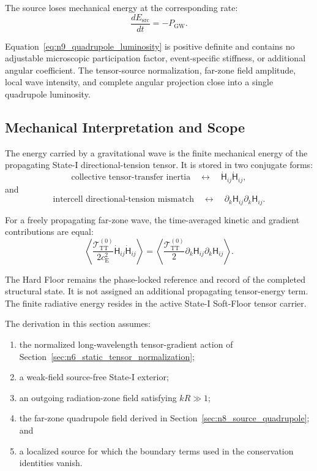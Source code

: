The source loses mechanical energy at the corresponding rate:
\begin{equation}
    \frac{dE_{\mathrm{src}}}{dt} = - P_{\mathrm{GW}}.
    \label{eq:n9_source_energy_loss}
\end{equation}

Equation~\eqref{eq:n9_quadrupole_luminosity} is positive definite and contains no adjustable microscopic participation factor, event-specific stiffness, or additional angular coefficient. The tensor-source normalization, far-zone field amplitude, local wave intensity, and complete angular projection close into a single quadrupole luminosity.

\subsection{Mechanical Interpretation and Scope}
\label{subsec:n9_mechanical_interpretation}

The energy carried by a gravitational wave is the finite mechanical energy of the propagating State-I directional-tension tensor. It is stored in two conjugate forms:
\begin{equation}
    \text{collective tensor-transfer inertia} \quad\longleftrightarrow\quad \dot{\mathsf{H}}_{ij} \dot{\mathsf{H}}_{ij},
\end{equation}
and
\begin{equation}
    \text{intercell directional-tension mismatch} \quad\longleftrightarrow\quad \partial_{k}\mathsf{H}_{ij} \partial_{k}\mathsf{H}_{ij}.
\end{equation}

For a freely propagating far-zone wave, the time-averaged kinetic and gradient contributions are equal:
\begin{equation}
    \left\langle \frac{ \mathcal{T}_{\mathrm{TT}}^{(0)} }{ 2c_{\mathrm{E}}^{2} } \dot{\mathsf{H}}_{ij} \dot{\mathsf{H}}_{ij} \right\rangle = \left\langle \frac{ \mathcal{T}_{\mathrm{TT}}^{(0)} }{2} \partial_{k}\mathsf{H}_{ij} \partial_{k}\mathsf{H}_{ij} \right\rangle.
\end{equation}

The Hard Floor remains the phase-locked reference and record of the completed structural state. It is not assigned an additional propagating tensor-energy term. The finite radiative energy resides in the active State-I Soft-Floor tensor carrier.

The derivation in this section assumes:
\begin{enumerate}
    \item the normalized long-wavelength tensor-gradient action of Section~\ref{sec:n6_static_tensor_normalization};
    \item a weak-field source-free State-I exterior;
    \item an outgoing radiation-zone field satisfying $kR \gg 1$;
    \item the far-zone quadrupole field derived in Section~\ref{sec:n8_source_quadrupole}; and
    \item a localized source for which the boundary terms used in the conservation identities vanish.
\end{enumerate}

